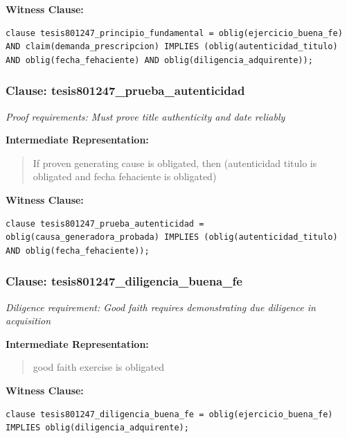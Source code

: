 \documentclass[11pt,a4paper]{article}
\begin{document}
\textbf{Witness Clause:}

\begin{lstlisting}[style=witnessstyle, language=Witness]
clause tesis801247_principio_fundamental = oblig(ejercicio_buena_fe) AND claim(demanda_prescripcion) IMPLIES (oblig(autenticidad_titulo) AND oblig(fecha_fehaciente) AND oblig(diligencia_adquirente));
\end{lstlisting}

\subsubsection{Clause: tesis801247\_prueba\_autenticidad}

\textit{Proof requirements: Must prove title authenticity and date reliably}

\textbf{Intermediate Representation:}

\begin{quote}
If proven generating cause is obligated, then (autenticidad titulo is obligated and fecha fehaciente is obligated)
\end{quote}

\textbf{Witness Clause:}

\begin{lstlisting}[style=witnessstyle, language=Witness]
clause tesis801247_prueba_autenticidad = oblig(causa_generadora_probada) IMPLIES (oblig(autenticidad_titulo) AND oblig(fecha_fehaciente));
\end{lstlisting}

\subsubsection{Clause: tesis801247\_diligencia\_buena\_fe}

\textit{Diligence requirement: Good faith requires demonstrating due diligence in acquisition}

\textbf{Intermediate Representation:}

\begin{quote}
good faith exercise is obligated
\end{quote}

\textbf{Witness Clause:}

\begin{lstlisting}[style=witnessstyle, language=Witness]
clause tesis801247_diligencia_buena_fe = oblig(ejercicio_buena_fe) IMPLIES oblig(diligencia_adquirente);
\end{lstlisting}
\end{document}

